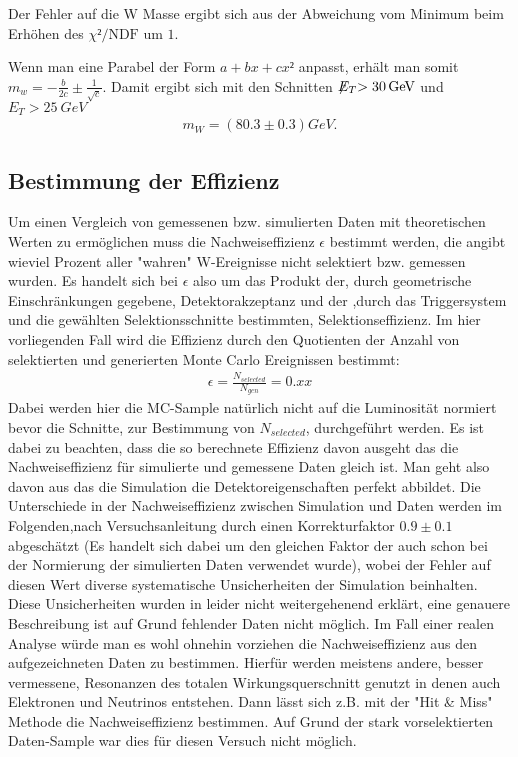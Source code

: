 \documentclass[a4paper,12pt]{article}
\newcommand{\met}{\ensuremath{\not\mathrel{E}}_T}
\begin{document}
Der Fehler auf die W Masse ergibt sich aus der Abweichung vom Minimum beim Erhöhen des
$χ²/\text{NDF}$ um $1$.

Wenn man eine Parabel der Form $a + bx + cx²$ anpasst, erhält man somit $m_w = -\frac{b}{2c} ±
\frac{1}{\sqrt{c}}$.
Damit ergibt sich mit den Schnitten $\met > \SI{30}{GeV}$ und $E_{T} > \SI{25}{GeV}$
\begin{align*}
	m_W =  ( 80.3 ± 0.3 ) \si{GeV}.
\end{align*}


\subsection{Bestimmung der Effizienz}
\label{effizienz}
Um einen Vergleich von gemessenen bzw. simulierten Daten mit theoretischen Werten zu ermöglichen muss die Nachweiseffizienz
$\epsilon$ bestimmt werden, die angibt wieviel Prozent aller "wahren" W-Ereignisse nicht selektiert bzw. gemessen wurden.
Es handelt sich bei $\epsilon$ also um das Produkt der, durch geometrische Einschränkungen gegebene, Detektorakzeptanz und der
,durch das Triggersystem und die gewählten Selektionsschnitte bestimmten, Selektionseffizienz. Im hier vorliegenden Fall wird die
Effizienz durch den Quotienten der Anzahl von selektierten und generierten Monte Carlo Ereignissen bestimmt:
\begin{align*}
	\epsilon = \frac{N_{selected}}{N_{gen}} = 0.xx
\end{align*}
Dabei werden hier die MC-Sample natürlich nicht auf die Luminosität normiert bevor die Schnitte, zur Bestimmung von $N_{selected}$, durchgeführt
werden.   
Es ist dabei zu beachten, dass die so berechnete Effizienz davon ausgeht das die Nachweiseffizienz für simulierte und gemessene
Daten gleich ist. Man geht also davon aus das die Simulation die Detektoreigenschaften perfekt abbildet. Die Unterschiede in der
Nachweiseffizienz zwischen Simulation und Daten werden im Folgenden,nach Versuchsanleitung \cite{versuchsanleitung} durch einen 
Korrekturfaktor $0.9\pm0.1$ abgeschätzt (Es handelt sich dabei um den gleichen Faktor der auch schon bei der Normierung der simulierten Daten 
verwendet wurde), wobei der Fehler auf diesen Wert diverse systematische Unsicherheiten der Simulation
beinhalten. Diese Unsicherheiten wurden in \cite{versuchsanleitung} leider nicht weitergehenend erklärt, eine genauere Beschreibung
ist auf Grund fehlender Daten nicht möglich. Im Fall einer realen Analyse würde man es wohl ohnehin vorziehen die Nachweiseffizienz aus
den aufgezeichneten Daten zu bestimmen. Hierfür werden meistens andere, besser vermessene, Resonanzen des totalen Wirkungsquerschnitt genutzt 
in denen auch Elektronen und Neutrinos entstehen. Dann lässt sich z.B. mit der "Hit \& Miss" Methode die Nachweiseffizienz bestimmen. Auf Grund
der stark vorselektierten Daten-Sample war dies für diesen Versuch nicht möglich.
\end{document}
